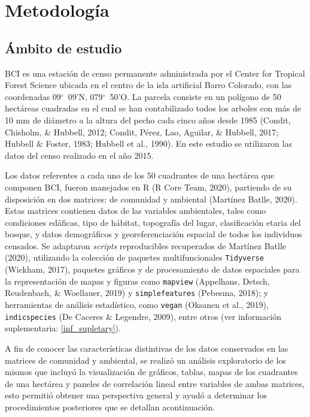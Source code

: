 \documentclass[11pt,]{article}
\begin{document}
\section{Metodología}\label{metodologuxeda}

\subsection{Ámbito de estudio}\label{uxe1mbito-de-estudio}

BCI es una estación de censo permanente administrada por el Center for
Tropical Forest Science ubicada en el centro de la isla artificial Barro
Colorado, con las coordenadas 09\(^\circ\)~09'N, 079\(^\circ\)~50'O. La
parcela consiste en un polígono de 50 hectáreas cuadradas en el cual se
han contabilizado todos los arboles con más de 10 mm de diámetro a la
altura del pecho cada cinco años desde 1985 (Condit, Chisholm, \&
Hubbell, 2012; Condit, Pérez, Lao, Aguilar, \& Hubbell, 2017; Hubbell \&
Foster, 1983; Hubbell et al., 1990). En este estudio se utilizaron las
datos del censo realizado en el año 2015.

Los datos referentes a cada uno de los 50 cuadrantes de una hectárea que
componen BCI, fueron manejados en R (R Core Team, 2020), partiendo de su
disposición en dos matrices: de comunidad y ambiental (Martínez Batlle,
2020). Estas matrices contienen datos de las variables ambientales,
tales como condiciones edáficas, tipo de hábitat, topografía del lugar,
clasificación etaria del bosque, y datos demográficos y
georeferenciación espacial de todos los individuos censados. Se
adaptaron \emph{scripts} reproducibles recuperados de Martínez Batlle
(2020), utilizando la colección de paquetes multifuncionales
\texttt{Tidyverse} (Wickham, 2017), paquetes gráficos y de procesamiento
de datos espaciales para la representación de mapas y figuras como
\texttt{mapview} (Appelhans, Detsch, Reudenbach, \& Woellauer, 2019) y
\texttt{simplefeatures} (Pebesma, 2018); y herramientas de análisis
estadístico, como \texttt{vegan} (Oksanen et al., 2019),
\texttt{indicspecies} (De Caceres \& Legendre, 2009), entre otros (ver
información suplementaria: \ref{inf_supletary}).

A fin de conocer las características distintivas de los datos
conservados en las matrices de comunidad y ambiental, se realizó un
análisis exploratorio de los mismos que incluyó la visualización de
gráficos, tablas, mapas de los cuadrantes de una hectárea y paneles de
correlación lineal entre variables de ambas matrices, esto permitió
obtener una perspectiva general y ayudó a determinar los procedimientos
posteriores que se detallan acontinuación.
\end{document}
